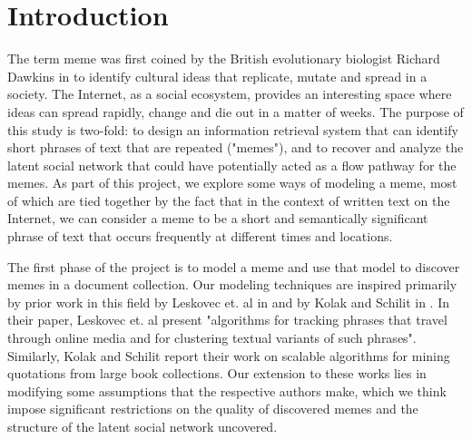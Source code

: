 \documentclass{acm_proc_article-sp}
\begin{document}
\date{02 November 2011}

\maketitle


\section{Introduction}
The term meme was first coined by the British evolutionary biologist Richard Dawkins in \cite{dawkins2006selfish} to identify cultural ideas that replicate, mutate and spread in a society. The Internet, as a social ecosystem, provides an interesting space where ideas can spread rapidly, change and die out in a matter of weeks. The purpose of this study is two-fold: to design an information retrieval system that can identify short phrases of text that are repeated ("memes"), and to recover and analyze the latent social network that could have potentially acted as a flow pathway for the memes. As part of this project, we explore some ways of modeling a meme, most of which are tied together by the fact that in the context of written text on the Internet, we can consider a meme to be a short and semantically significant phrase of text that occurs frequently at different times and locations. 

The first phase of the project is to model a meme and use that model to discover memes in a document collection. Our modeling techniques are inspired primarily by prior work in this field by Leskovec et. al in \cite{leskovec2009meme} and by Kolak and Schilit in \cite{kolak2008generating}. In their paper, Leskovec et. al present "algorithms for tracking phrases that travel through online media and for clustering textual variants of such phrases". Similarly, Kolak and Schilit report their work on scalable algorithms for mining quotations from large book collections. Our extension to these works lies in modifying some assumptions that the respective authors make, which we think impose significant restrictions on the quality of discovered memes and the structure of the latent social network uncovered.
\end{document}
